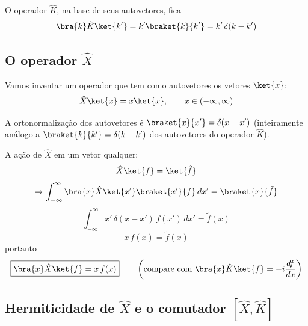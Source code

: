 
O operador $\hat{K}$, na base de seus autovetores, fica
\begin{equation}
\bra{k}\hat{K}\ket{k'} = k'\braket{k}{k'} = k'\,\delta(k-k')
\label{eq:aula7_K_na_base_propria}
\end{equation}

\subsection*{O operador $\hat{X}$}

Vamos inventar um operador que tem como autovetores os vetores $\ket{x}$:
\begin{equation}
\hat{X}\ket{x} = x\ket{x}, \qquad x \in (-\infty,\infty)
\label{eq:aula7_X_autovalor}
\end{equation}

A ortonormalização dos autovetores é $\braket{x}{x'} = \delta(x-x')$ (inteiramente análogo a $\braket{k}{k'} = \delta(k-k')$ dos autovetores do operador $\hat{K}$).

A ação de $\hat{X}$ em um vetor qualquer:
\begin{equation}
\hat{X}\ket{f} = \ket{\tilde{f}}
\label{eq:aula7_X_acao}
\end{equation}
\begin{equation}
\Rightarrow \int_{-\infty}^{\infty} \bra{x}\hat{X}\ket{x'}\braket{x'}{f}\,dx' = \braket{x}{\tilde{f}}
\label{eq:aula7_X_acao2}
\end{equation}
\begin{equation}
\int_{-\infty}^{\infty} x'\,\delta(x-x')\,f(x')\,dx' = \tilde{f}(x)
\label{eq:aula7_X_acao3}
\end{equation}
\begin{equation}
x\,f(x) = \tilde{f}(x)
\label{eq:aula7_X_acao4}
\end{equation}
portanto
\begin{equation}
\boxed{\bra{x}\hat{X}\ket{f} = x\,f(x)} \qquad \left(\text{compare com } \bra{x}\hat{K}\ket{f} = -i\frac{df}{dx}\right)
\label{eq:aula7_X_resultado}
\end{equation}

\subsection*{Hermiticidade de $\hat{X}$ e o comutador $[\hat{X},\hat{K}]$}

